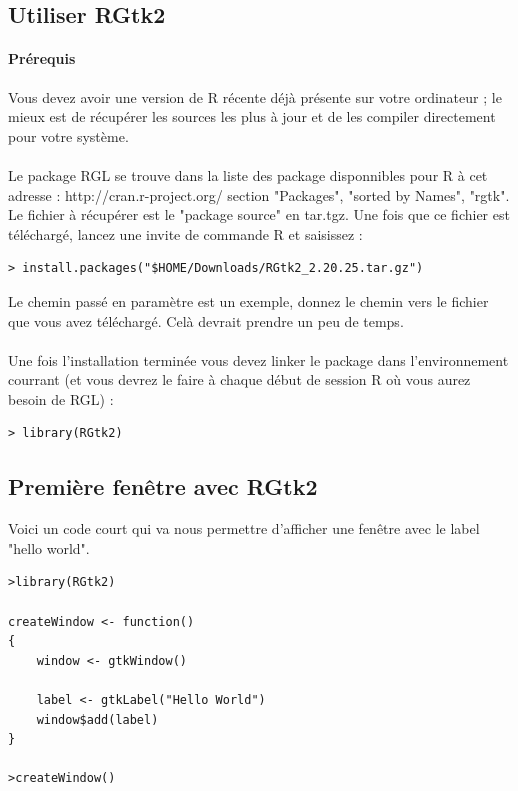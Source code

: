 \newpage
\subsection{Utiliser RGtk2}

\paragraph{Prérequis} Vous devez avoir une version de R récente déjà présente sur votre ordinateur ; le mieux est de récupérer les sources les plus à jour et de les compiler directement pour votre système. 
\\ \\
Le package RGL se trouve dans la liste des package disponnibles pour R à cet adresse : http://cran.r-project.org/ section "Packages", "sorted by Names", "rgtk". Le fichier à récupérer est le "package source" en tar.tgz. Une fois que ce fichier est téléchargé, lancez une invite de commande R et saisissez : 

\begin{lstlisting}
> install.packages("$HOME/Downloads/RGtk2_2.20.25.tar.gz")
\end{lstlisting}

Le chemin passé en paramètre est un exemple, donnez le chemin vers le fichier que vous avez téléchargé. Celà devrait prendre un peu de temps. \\ \\
Une fois l'installation terminée vous devez linker le package dans l'environnement courrant (et vous devrez le faire à chaque début de session R où vous aurez besoin de RGL) : 

\begin{lstlisting}
> library(RGtk2)
\end{lstlisting}
\newpage

\subsection{Première fen\^etre avec RGtk2}

Voici un code court qui va nous permettre d'afficher une fen\^etre avec le label "hello world". \\

\begin{lstlisting}
>library(RGtk2)
 
createWindow <- function()
{
    window <- gtkWindow()
 
    label <- gtkLabel("Hello World")
    window$add(label)
}
 
>createWindow()
\end{lstlisting}

